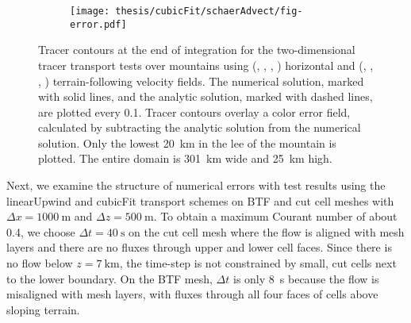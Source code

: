 \begin{figure}
	\centering
	\begin{subfigure}{\textwidth}
		\centering
		\texttt{[image: thesis/cubicFit/schaerAdvect/fig-error.pdf]}
		\label{fig:cubicFit:schaerAdvect:error:btf:linearUpwind}
		\label{fig:cubicFit:schaerAdvect:error:cutCell:linearUpwind}
		\label{fig:cubicFit:schaerAdvect:error:btf:cubicFit}
		\label{fig:cubicFit:schaerAdvect:error:cutCell:cubicFit}
		\label{fig:cubicFit:tfAdvect:error:btf:linearUpwind}
		\label{fig:cubicFit:tfAdvect:error:cutCell:linearUpwind}
		\label{fig:cubicFit:tfAdvect:error:btf:cubicFit}
		\label{fig:cubicFit:tfAdvect:error:cutCell:cubicFit}
	\end{subfigure}
	\caption{Tracer contours at the end of integration for the two-dimensional tracer transport tests over mountains using
	(,
	,
	,
	) horizontal and 
	(,
	,
	,
	) terrain-following velocity fields.  The numerical solution, marked with solid lines, and the analytic solution, marked with dashed lines, are plotted every \num{0.1}.  Tracer contours overlay a color error field, calculated by subtracting the analytic solution from the numerical solution.  Only the lowest \SI{20}{\kilo\meter} in the lee of the mountain is plotted.  The entire domain is \SI{301}{\kilo\meter} wide and \SI{25}{\kilo\meter} high.
	}
	
	\label{fig:cubicFit:schaerAdvect:error}
\end{figure}

Next, we examine the structure of numerical errors with test results using the linearUpwind and cubicFit transport schemes on BTF and cut cell meshes with $\Delta x = \SI{1000}{\meter}$ and $\Delta z = \SI{500}{\meter}$.  To obtain a maximum Courant number of about \num{0.4}, we choose $\Delta t = \SI{40}{\second}$ on the cut cell mesh where the flow is aligned with mesh layers and there are no fluxes through upper and lower cell faces.  Since there is no flow below $z = \SI{7}{\kilo\meter}$, the time-step is not constrained by small, cut cells next to the lower boundary.
On the BTF mesh, $\Delta t$ is only \SI{8}{\second} because the flow is misaligned with mesh layers, with fluxes through all four faces of cells above sloping terrain.

